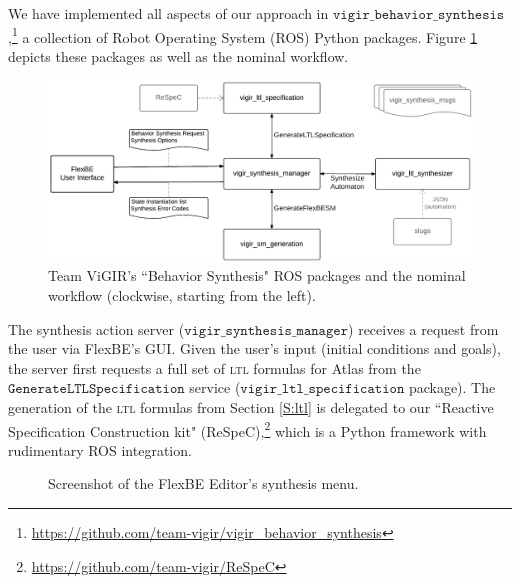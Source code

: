 
We have implemented all aspects of our approach in $\mathtt{vigir\_behavior\_synthesis}$,\footnote{\scriptsize{\url{https://github.com/team-vigir/vigir_behavior_synthesis}}}
 a collection of Robot Operating System (ROS) Python packages.
Figure \ref{Fig:vigir_behavior_synthesis} depicts these packages as well as the nominal workflow.

\begin{figure}[t]
\centering
\includegraphics[width=0.99\columnwidth,clip]{./img/behavior_synthesis_packages.png}
\caption{
	Team ViGIR's ``Behavior Synthesis" ROS packages and the nominal workflow (clockwise, starting from the left).
}
\label{Fig:vigir_behavior_synthesis}
\end{figure}

The synthesis action server ($\mathtt{vigir\_synthesis\_manager}$) receives a request from the user via FlexBE's GUI.
Given the user's input (initial conditions and goals), the server first requests a full set of \textsc{ltl} formulas for Atlas from the $\mathtt{Generate LTL Specification}$ service ($\mathtt{vigir\_ltl\_specification}$ package).
The generation of the \textsc{ltl} formulas from Section \ref{S:ltl} is delegated to our ``Reactive Specification Construction kit" (ReSpeC),\footnote{\scriptsize{\url{https://github.com/team-vigir/ReSpeC}}}
 which is a Python framework with rudimentary ROS integration.

\begin{figure}[t]
\centering
{}
\caption{Screenshot of the FlexBE Editor's synthesis menu.
}
\label{Fig:SynthesisMenuSimple}
\end{figure}

